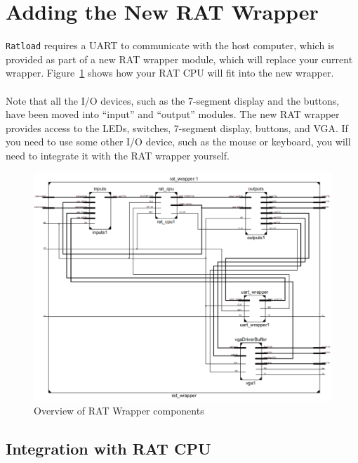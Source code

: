 \documentclass[notitlepage]{article}
\begin{document}
\section{Adding the New RAT Wrapper}
\texttt{Ratload} requires a UART to communicate with the host computer, which is provided as part of a new RAT wrapper module, which will replace your current wrapper. Figure~\ref{fig:ratwrapper} shows how your RAT CPU will fit into the new wrapper.\\\\
Note that all the I/O devices, such as the 7-segment display and the buttons, have been moved into ``input'' and ``output'' modules. The new RAT wrapper provides access to the LEDs, switches, 7-segment display, buttons, and VGA. If you need to use some other I/O device, such as the mouse or keyboard, you will need to integrate it with the RAT wrapper yourself.

\begin{figure}[ht!]
  \centering
  \includegraphics[width=1\textwidth]{rat_wrapper.png}
  \caption{Overview of RAT Wrapper components}
  \label{fig:ratwrapper}
\end{figure}

\subsection{Integration with RAT CPU}
\end{document}
